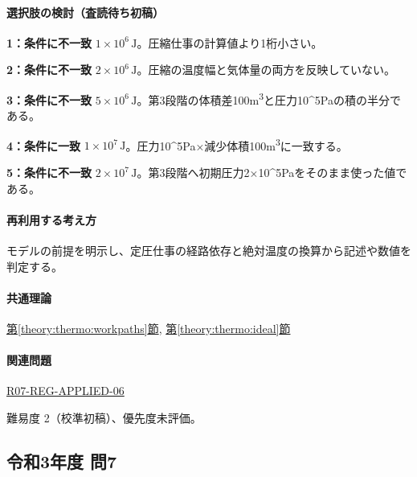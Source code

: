 \paragraph{選択肢の検討（査読待ち初稿）}\mbox{}\par

\noindent\textbf{1：条件に不一致} \(1\times10^6\,\mathrm{J}\)。圧縮仕事の計算値より1桁小さい。\par

\noindent\textbf{2：条件に不一致} \(2\times10^6\,\mathrm{J}\)。圧縮の温度幅と気体量の両方を反映していない。\par

\noindent\textbf{3：条件に不一致} \(5\times10^6\,\mathrm{J}\)。第3段階の体積差100m\textsuperscript{3}と圧力10\textasciicircum{}5Paの積の半分である。\par

\noindent\textbf{4：条件に一致} \(1\times10^7\,\mathrm{J}\)。圧力10\textasciicircum{}5Pa×減少体積100m\textsuperscript{3}に一致する。\par

\noindent\textbf{5：条件に不一致} \(2\times10^7\,\mathrm{J}\)。第3段階へ初期圧力2×10\textasciicircum{}5Paをそのまま使った値である。\par

\paragraph{再利用する考え方} モデルの前提を明示し、定圧仕事の経路依存と絶対温度の換算から記述や数値を判定する。

\paragraph{共通理論} \hyperref[theory:thermo:workpaths]{第\ref*{theory:thermo:workpaths}節}, \hyperref[theory:thermo:ideal]{第\ref*{theory:thermo:ideal}節}

\paragraph{関連問題} \hyperref[q:r07-reg-applied-06]{R07-REG-APPLIED-06}

\par 難易度 2（校準初稿）、優先度未評価。

\subsection{令和3年度 問7}
\label{q:r03-reg-applied-07}

